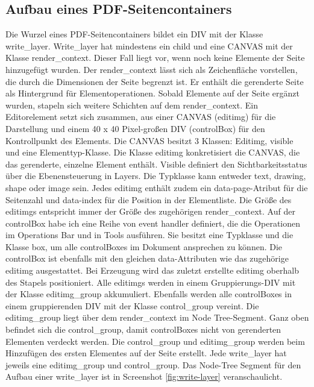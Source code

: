 \subsection{Aufbau eines PDF-Seitencontainers}
Die Wurzel eines PDF-Seitencontainers bildet ein DIV mit der Klasse write\_layer. Write\_layer hat mindestens ein child und eine CANVAS mit der Klasse render\_context. Dieser Fall liegt vor, wenn noch keine Elemente der Seite hinzugefügt wurden. Der render\_context lässt sich als Zeichenfläche vorstellen, die durch die Dimensionen der Seite begrenzt ist. Er enthält die gerenderte Seite als Hintergrund für Elementoperationen. Sobald Elemente auf der Seite ergänzt wurden, stapeln sich weitere Schichten auf dem render\_context. Ein Editorelement setzt sich zusammen, aus einer CANVAS (editimg) für die Darstellung und einem 40 x 40 Pixel-großen DIV (controlBox) für den Kontrollpunkt des Elements. Die CANVAS besitzt 3 Klassen: Editimg, visible und eine Elementtyp-Klasse. Die Klasse editimg konkretisiert die CANVAS, die das gerenderte, einzelne Element enthält. Visible definiert den Sichtbarkeitsstatus über die Ebenensteuerung in Layers. Die Typklasse kann entweder text, drawing, shape oder image sein. Jedes editimg enthält zudem ein data-page-Atribut für die Seitenzahl und data-index für die Position in der Elementliste. Die Größe des editimgs entspricht immer der Größe des zugehörigen render\_context. Auf der controlBox habe ich eine Reihe von event handler definiert, die die Operationen im Operations Bar und in Tools ausführen. Sie besitzt eine Typklasse und die Klasse box, um alle controlBoxes im Dokument ansprechen zu können. Die controlBox ist ebenfalls mit den gleichen data-Attributen wie das zugehörige editimg ausgestattet. Bei Erzeugung wird das zuletzt erstellte editimg oberhalb des Stapels positioniert. Alle editimgs werden in einem Gruppierungs-DIV mit der Klasse editimg\_group akkumuliert. Ebenfalls werden alle controlBoxes in einem gruppierenden DIV mit der Klasse control\_group vereint. Die editimg\_group liegt über dem render\_context im Node Tree-Segment. Ganz oben befindet sich die control\_group, damit controlBoxes nicht von gerenderten Elementen verdeckt werden. Die control\_group und editimg\_group werden beim Hinzufügen des ersten Elementes auf der Seite erstellt. Jede write\_layer hat jeweils eine editimg\_group und control\_group. Das Node-Tree Segment für den Aufbau einer write\_layer ist in Screenshot \ref{fig:write-layer} veranschaulicht. 

